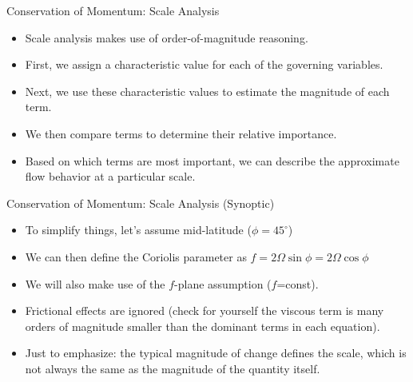 \begin{frame}{Conservation of Momentum: Scale Analysis}

\begin{itemize}
	\item Scale analysis makes use of order-of-magnitude reasoning.
	\item First, we assign a characteristic value for each of the governing variables. 
	\item Next, we use these characteristic values to estimate the magnitude of each term.
	\item We then compare terms to determine their relative importance.
	\item Based on which terms are most important, we can describe the approximate flow behavior at a particular scale.
\end{itemize}
\end{frame}
\begin{frame}{Conservation of Momentum: Scale Analysis (Synoptic)}

\begin{itemize}
\item To simplify things, let's assume mid-latitude ($\phi = 45^\circ$)
\item We can then define the Coriolis parameter as $f=2\Omega \sin \phi = 2\Omega\cos\phi$
\item We will also make use of the $f$-plane assumption ($f$=const).
\item Frictional effects are ignored (check for yourself the viscous term is many orders of magnitude smaller than the dominant terms in each equation).
\item Just to emphasize: the typical magnitude of change defines the scale, which is not always the same as the magnitude of the quantity itself.
\end{itemize}
\end{frame}
